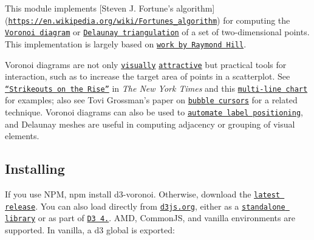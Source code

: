 This module implements \mbox{[}Steven J. Fortune’s algorithm\mbox{]}(\href{https://en.wikipedia.org/wiki/Fortune's_algorithm}{\tt https\+://en.\+wikipedia.\+org/wiki/\+Fortune\textquotesingle{}s\+\_\+algorithm}) for computing the \href{https://en.wikipedia.org/wiki/Voronoi_diagram}{\tt Voronoi diagram} or \href{https://en.wikipedia.org/wiki/Delaunay_triangulation}{\tt Delaunay triangulation} of a set of two-\/dimensional points. This implementation is largely based on \href{http://www.raymondhill.net/voronoi/rhill-voronoi.html}{\tt work by Raymond Hill}.

Voronoi diagrams are not only \href{http://bl.ocks.org/mbostock/4360892}{\tt visually} \href{http://bl.ocks.org/mbostock/4636377}{\tt attractive} but practical tools for interaction, such as to increase the target area of points in a scatterplot. See \href{http://www.nytimes.com/interactive/2013/03/29/sports/baseball/Strikeouts-Are-Still-Soaring.html}{\tt “\+Strikeouts on the Rise”} in {\itshape The New York Times} and this \href{http://bl.ocks.org/mbostock/8033015}{\tt multi-\/line chart} for examples; also see Tovi Grossman’s paper on \href{http://www.tovigrossman.com/BubbleCursor}{\tt bubble cursors} for a related technique. Voronoi diagrams can also be used to \href{http://bl.ocks.org/mbostock/6909318}{\tt automate label positioning}, and Delaunay meshes are useful in computing adjacency or grouping of visual elements.

\href{http://bl.ocks.org/mbostock/6675193}{\tt } \href{http://bl.ocks.org/mbostock/4060366}{\tt } \href{http://bl.ocks.org/mbostock/4341156}{\tt } \href{http://bl.ocks.org/mbostock/4360892}{\tt } \href{http://bl.ocks.org/mbostock/7608400}{\tt } \href{http://bl.ocks.org/mbostock/4636377}{\tt } \href{http://bl.ocks.org/mbostock/1073373}{\tt } \href{http://bl.ocks.org/mbostock/8033015}{\tt } \href{http://bl.ocks.org/mbostock/c6966db1fcb0ed2988da}{\tt } \href{http://bl.ocks.org/mbostock/ec10387f24c1fad2acac3bc11eb218a5}{\tt }

\subsection*{Installing}

If you use N\+PM, {\ttfamily npm install d3-\/voronoi}. Otherwise, download the \href{https://github.com/d3/d3-voronoi/releases/latest}{\tt latest release}. You can also load directly from \href{https://d3js.org}{\tt d3js.\+org}, either as a \href{https://d3js.org/d3-voronoi.v1.min.js}{\tt standalone library} or as part of \href{https://github.com/d3/d3}{\tt D3 4.}. A\+MD, Common\+JS, and vanilla environments are supported. In vanilla, a {\ttfamily d3} global is exported\+:


